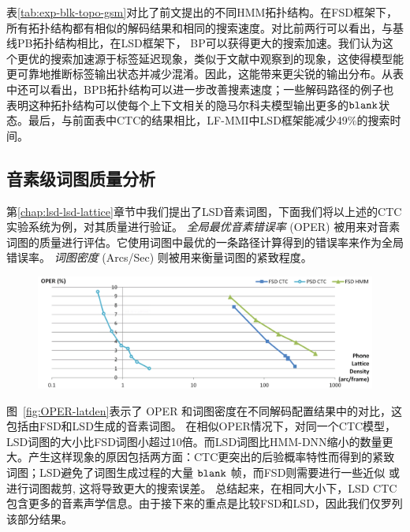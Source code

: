 表\ref{tab:exp-blk-topo-gsm}对比了前文提出的不同HMM拓扑结构。在FSD框架下，所有拓扑结构都有相似的解码结果和相同的搜索速度。对比前两行可以看出，与基线PB拓扑结构相比，在LSD框架下， BP可以获得更大的搜索加速。我们认为这个更优的搜索加速源于标签延迟现象，类似于文献\cite{amodei2015deep}中观察到的现象，这使得模型能更可靠地推断标签输出状态并减少混淆。因此，这能带来更尖锐的输出分布。从表中还可以看出，BPB拓扑结构可以进一步改善搜素速度；一些解码路径的例子也表明这种拓扑结构可以使每个上下文相关的隐马尔科夫模型输出更多的$\tt blank$状态。最后，与前面表中CTC的结果相比，LF-MMI中LSD框架能减少49\%的搜索时间。


\subsection{音素级词图质量分析}
\label{sec:exp-lsd-lat-quality}

第\ref{chap:lsd-lsd-lattice}章节中我们提出了LSD音素词图，下面我们将以上述的CTC实验系统为例，对其质量进行验证。
%
{\em 全局最优音素错误率} (OPER) 被用来对音素词图的质量进行评估。它使用词图中最优的一条路径计算得到的错误率来作为全局错误率\cite{hoffmeister2006frame}。 {\em 词图密度} (Arcs/Sec) 则被用来衡量词图的紧致程度\cite{woodland1994large}。


\begin{figure}[!htp]
  \centering
    \captionstyle{\centering}
    \includegraphics[width=\textwidth]{figure/OPER-latden.png}
\end{figure}


图~\ref{fig:OPER-latden}表示了 OPER 和词图密度在不同解码配置结果中的对比，这包括由FSD和LSD生成的音素词图。
在相似OPER情况下，对同一个CTC模型，LSD词图的大小比FSD词图小超过10倍。而LSD词图比HMM-DNN缩小的数量更大。产生这样现象的原因包括两方面：CTC更突出的后验概率特性而得到的紧致词图；LSD避免了词图生成过程的大量 $\tt blank$ 帧，而FSD则需要进行一些近似 \cite{ljolje1999efficient} 或进行词图裁剪\cite{povey2012generating}, 这将导致更大的搜索误差。
总结起来，在相同大小下，LSD CTC包含更多的音素声学信息。由于接下来的重点是比较FSD和LSD，因此我们仅罗列该部分结果。


